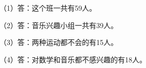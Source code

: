 
\begingroup\color{answerred}\noindent（1）答：这个班一共有59人。\par
\noindent（2）答：音乐兴趣小组一共有39人。\par
\noindent（3）答：两种运动都不会的有15人。\par
\noindent（4）答：对数学和音乐都不感兴趣的有18人。\par\par\endgroup
